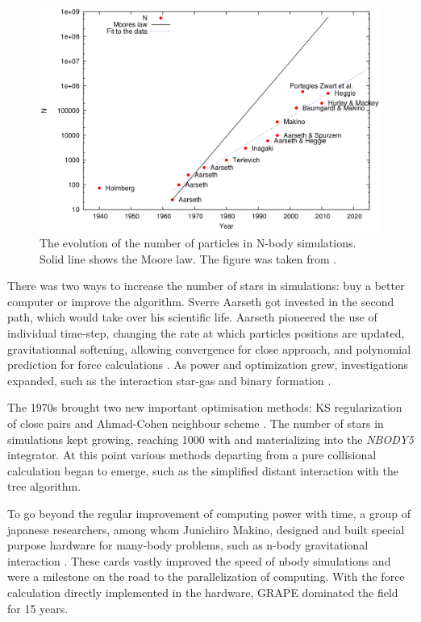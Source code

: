 \begin{figure}
\label{Fig:N_increase}
\includegraphics[width=0.9\linewidth]{Figures/0_N_increase.png}
\caption{The evolution of the number of particles in N-body simulations. Solid line shows the Moore law. The figure was taken from \protect\cite{Bedorf2012}. }
\end{figure}


There was two ways to increase the number of stars in simulations: buy a better computer or improve the algorithm. Sverre Aarseth got invested in the second path, which would take over his scientific life. Aarseth pioneered the use of individual time-step, changing the rate at which particles positions are updated, gravitationnal softening, allowing convergence for close approach, and polynomial prediction for force calculations \citep{Aarseth1964}. As power and optimization grew, investigations expanded, such as the interaction star-gas \citep{VanAlbada1968a} and binary formation \citep{VanAlbada1968b}.

The 1970s brought two new important optimisation methods: KS regularization of close pairs \citep{Aarseth1972} and Ahmad-Cohen neighbour scheme \citep{AhmadCohen1973}. The number of stars in simulations kept growing, reaching 1000 with \cite{Terlevich1980} and materializing into the \textit{NBODY5} integrator. At this point various methods departing from a pure collisional calculation began to emerge, such as the simplified distant interaction with the \cite{BarnesHut1986} tree algorithm.

To go beyond the regular improvement of computing power with time, a group of japanese researchers, among whom Junichiro Makino, designed and built special purpose hardware for many-body problems, such as n-body gravitational interaction \citep{Ebisuzaki1990,Ito1991}. These cards vastly improved the speed of nbody simulations and were a milestone on the road to the parallelization of computing. With the force calculation directly implemented in the hardware, GRAPE dominated the field for 15 years.

